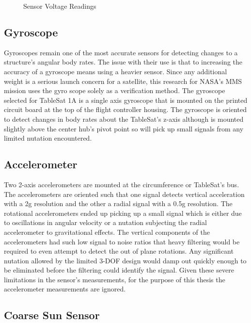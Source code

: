\begin{figure}[H]
\centerline{}
\caption{Sensor Voltage Readings}
\label{fig:SensorVoltageReadings}
\end{figure}

\subsection{Gyroscope}
\label{subsec:Gyroscope}

Gyroscopes remain one of the most accurate sensors for detecting changes to a structure's angular body rates.  The issue with their use is that to increasing the accuracy of a gyroscope means using a heavier sensor.  Since any additional weight is a serious launch concern for a satellite, this research for NASA's MMS mission uses the gyro scope solely as a verification method.  The gyroscope selected for TableSat 1A is a single axis gyroscope that is mounted on the printed circuit board at the top of the flight controller housing.  The gyroscope is oriented to detect changes in body rates about the TableSat's z-axis although is mounted slightly above the center hub's pivot point so will pick up small signals from any limited nutation encountered.

\subsection{Accelerometer}
\label{subsec:Accelerometer}

Two 2-axis accelerometers are mounted at the circumference or TableSat's bus.  The accelerometers are oriented such that one signal detects vertical acceleration with a 2g resolution and the other a radial signal with a 0.5g resolution.  The rotational accelerometers ended up picking up a small signal which is either due to oscillations in angular velocity or a nutation subjecting the radial accelerometer to gravitational effects.  The vertical components of the accelerometers had such low signal to noise ratios that heavy filtering would be required to even attempt to detect the out of plane rotations.  Any significant nutation allowed by the limited 3-DOF design would damp out quickly enough to be eliminated before the filtering could identify the signal.  Given these severe limitations in the sensor's measurements, for the purpose of this thesis the accelerometer measurements are ignored.

\subsection{Coarse Sun Sensor}
\label{subsec:CoarseSunSensor}

